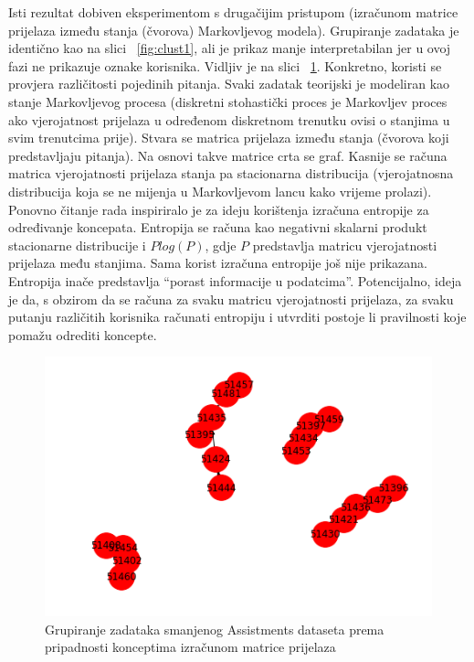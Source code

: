 \documentclass[times, utf8,projekt]{fer}
\begin{document}
\noindent Isti rezultat dobiven eksperimentom s drugačijim pristupom (izračunom matrice prijelaza između stanja (čvorova) Markovljevog modela). Grupiranje zadataka je identično kao na slici ~\ref{fig:clust1}, ali je prikaz manje interpretabilan jer u ovoj fazi ne prikazuje oznake korisnika. Vidljiv je na slici ~\ref{fig:clust2}.\newline
Konkretno, koristi se provjera različitosti pojedinih pitanja. Svaki zadatak teorijski je modeliran kao stanje Markovljevog procesa (diskretni stohastički proces je Markovljev proces ako vjerojatnost prijelaza u određenom diskretnom trenutku ovisi o stanjima u svim trenutcima prije). Stvara se matrica prijelaza između stanja (čvorova koji predstavljaju pitanja). Na osnovi takve matrice crta se graf. Kasnije se računa matrica vjerojatnosti prijelaza stanja pa stacionarna distribucija (vjerojatnosna distribucija koja se ne mijenja u Markovljevom lancu kako vrijeme prolazi). \newline
Ponovno čitanje rada \citep{6} inspiriralo je za ideju korištenja izračuna entropije za određivanje koncepata. Entropija se računa kao negativni skalarni produkt stacionarne distribucije i $Plog(P)$, gdje $P$ predstavlja matricu vjerojatnosti prijelaza među stanjima. Sama korist izračuna entropije još nije prikazana. Entropija inače predstavlja “porast informacije u podatcima”. Potencijalno, ideja je da, s obzirom da se računa za svaku matricu vjerojatnosti prijelaza, za svaku putanju različitih korisnika računati entropiju i utvrditi postoje li pravilnosti koje pomažu odrediti koncepte. 

\begin{figure}[!htb]
\centering
\includegraphics[scale=0.5]{clust2.png}
\caption{Grupiranje zadataka smanjenog Assistments dataseta prema pripadnosti konceptima izračunom matrice prijelaza}
\label{fig:clust2}
\end{figure}
\end{document}
